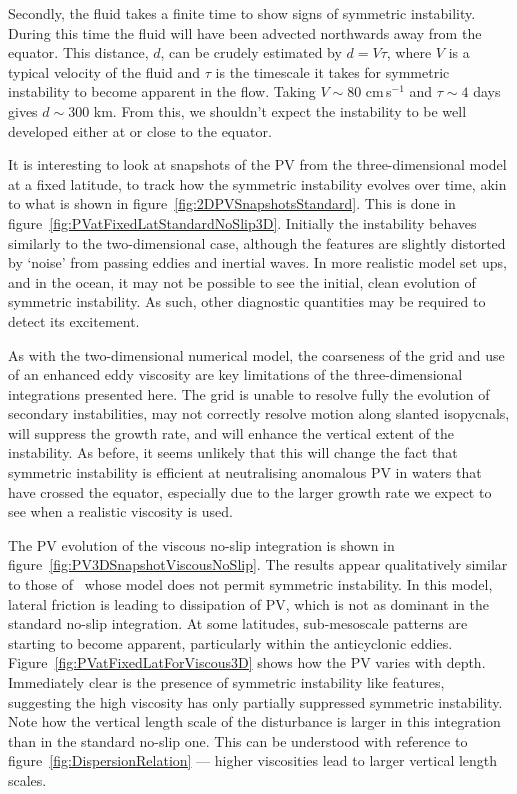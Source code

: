     Secondly, the fluid takes a finite time to show signs of symmetric instability. During this time the fluid will have been advected northwards away from the equator. This distance, $d$, can be crudely estimated by $d = V \tau$, where $V$ is a typical velocity of the fluid and $\tau$ is the timescale it takes for symmetric instability to become apparent in the flow. Taking $V\sim 80$ cm\,s$^{-1}$ and $\tau \sim 4$ days gives $d \sim 300$ km. From this, we shouldn't expect the instability to be well developed either at or close to the equator.
    
    It is interesting to look at snapshots of the PV from the three-dimensional model at a fixed latitude, to track how the symmetric instability evolves over time, akin to what is shown in figure~\ref{fig:2DPVSnapshotsStandard}. This is done in figure~\ref{fig:PVatFixedLatStandardNoSlip3D}. Initially the instability behaves similarly to the two-dimensional case, although the features are slightly distorted by `noise' from passing eddies and inertial waves. In more realistic model set ups, and in the ocean, it may not be possible to see the initial, clean evolution of symmetric instability. As such, other diagnostic quantities may be required to detect its excitement.

    As with the two-dimensional numerical model, the coarseness of the grid and use of an enhanced eddy viscosity are key limitations of the three-dimensional integrations presented here. The grid is unable to resolve fully the evolution of secondary instabilities, may not correctly resolve motion along slanted isopycnals, will suppress the growth rate, and will enhance the vertical extent of the instability. As before, it seems unlikely that this will change the fact that symmetric instability is efficient at neutralising anomalous PV in waters that have crossed the equator, especially due to the larger growth rate we expect to see when a realistic viscosity is used.

    The PV evolution of the viscous no-slip integration is shown in figure~\ref{fig:PV3DSnapshotViscousNoSlip}. The results appear qualitatively similar to those of~\citet{Edwards1998I} whose model does not permit symmetric instability. In this model, lateral friction is leading to dissipation of PV, which is not as dominant in the standard no-slip integration. At some latitudes, sub-mesoscale patterns are starting to become apparent, particularly within the anticyclonic eddies. Figure~\ref{fig:PVatFixedLatForViscous3D} shows how the PV varies with depth. Immediately clear is the presence of symmetric instability like features, suggesting the high viscosity has only partially suppressed symmetric instability. Note how the vertical length scale of the disturbance is larger in this integration than in the standard no-slip one. This  can be understood with reference to figure~\ref{fig:DispersionRelation} --- higher viscosities lead to larger vertical length scales.

